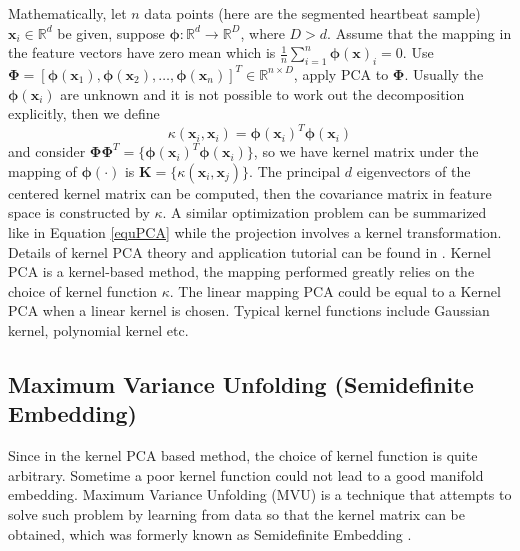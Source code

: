 \documentclass[journal]{IEEEtran}
\begin{document}
Mathematically, let $n$ data points (here are the segmented heartbeat sample) $\bm{x}_i \in \mathbb{R}^d$ be given, suppose $\bm{\phi}: \mathbb{R}^d \to \mathbb{R}^D$, where $D > d$.
Assume that the mapping in the feature vectors have zero mean which is $\frac{1}{n}\sum_{i=1}^n \bm{\phi}(\bm{x})_i = 0$. Use $\bm{\Phi} = [\bm{\phi} (\bm{x}_1), \bm{\phi}(\bm{x}_2), \ldots, \bm{\phi}(\bm{x}_n)]^T \in \mathbb{R}^{n \times D}$, apply PCA to $\bm{\Phi}$.
Usually the $\bm{\phi}(\bm{x}_i)$ are unknown and it is not possible to work out the decomposition explicitly, then we define 
\begin{equation}
\kappa(\bm{x}_i, \bm{x}_i) =\bm{\phi}(\bm{x}_i)^T\bm{\phi}(\bm{x}_i)
\end{equation}
and consider $\bm{\Phi}\bm{\Phi}^T = \{\bm{\phi}(\bm{x}_i)^T \bm{\phi}(\bm{x}_i)\}$, so we have kernel matrix under the mapping of $\bm{\phi}(\cdot)$ is $\bm{K} = \{\kappa(\bm{x}_i, \bm{x}_j)\}$.
The principal $d$ eigenvectors of the centered kernel matrix can be computed, then the covariance matrix in feature space is constructed by $\kappa$.
A similar optimization problem can be summarized like in Equation \ref{equPCA} while the projection involves a kernel transformation.
Details of kernel PCA theory and application tutorial can be found in \cite{shawe2004kernel, chatfield2018introduction, van2009dimensionality}.
Kernel PCA is a kernel-based method, the mapping performed greatly relies on the choice of kernel function $\kappa$.
The linear mapping PCA could be equal to a Kernel PCA when a linear kernel is chosen. Typical kernel functions include Gaussian kernel, polynomial kernel etc. 

%
%

\subsection{Maximum Variance Unfolding (Semidefinite Embedding)}
Since in the kernel PCA based method, the choice of kernel function is quite arbitrary. 
Sometime a poor kernel function could not lead to a good manifold embedding.
Maximum Variance Unfolding (MVU) is a technique that attempts to solve such problem by learning from data so that the kernel matrix can be obtained, which was formerly known as Semidefinite Embedding \cite{weinberger2006unsupervised}.
\end{document}
